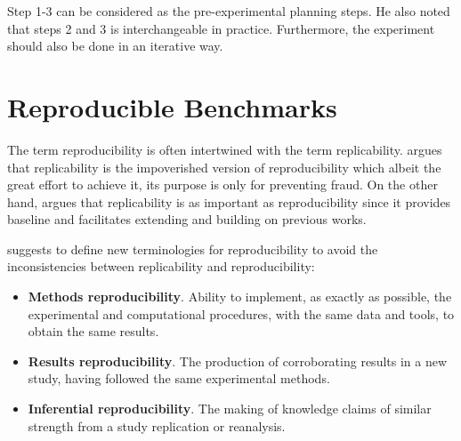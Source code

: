 Step 1-3 can be considered as the pre-experimental planning steps.
He also noted that steps 2 and 3 is interchangeable in practice.
Furthermore, the experiment should also be done in an iterative way.


\section{Reproducible Benchmarks}
\label{sec:reproducibleBenchmarks}

The term reproducibility is often intertwined with the term replicability.
\citet{drummondReplicabilityNotReproducibility2009} argues that replicability is the impoverished version of reproducibility which albeit the great effort to achieve it, its purpose is only for preventing fraud.
On the other hand, \citet{vitekR3RepeatabilityReproducibility2012} argues that replicability is as important as reproducibility since it provides baseline and facilitates extending and building on previous works.

\citet{goodmanWhatDoesResearch2016} suggests to define new terminologies for reproducibility to avoid the inconsistencies between replicability and reproducibility:
\begin{itemize}
	\item \textbf{Methods reproducibility}. Ability to implement, as exactly as possible, the experimental and computational procedures, with the same data and tools, to obtain the same results.
	\item \textbf{Results reproducibility}. The production of corroborating results in a new study, having followed the same experimental methods.
	\item \textbf{Inferential reproducibility}. The making of knowledge claims of similar strength from a study replication or reanalysis.
\end{itemize}

